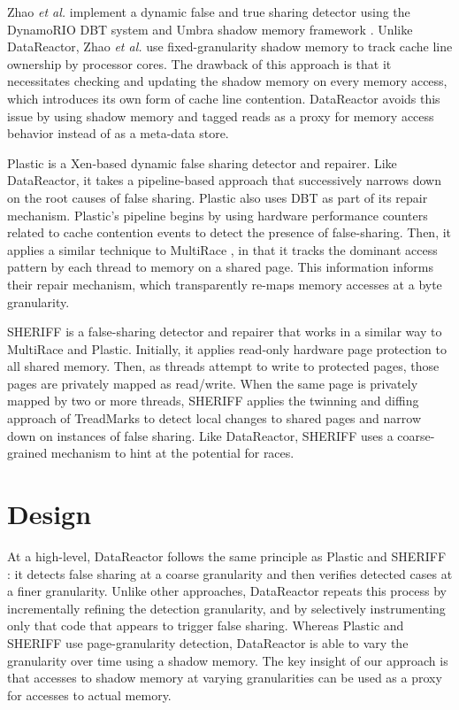\documentclass{sig-alternate}
\newcommand{\Toolname}{DataReactor}
\begin{document}

\newcommand{\DrContention}{Zhao \emph{et al.}}

\DrContention{} \cite{DrContention} implement a dynamic false and true sharing detector using the DynamoRIO \cite{DynamoRIO}
DBT system and Umbra shadow memory framework \cite{Umbra}. Unlike \Toolname{}, \DrContention{} use fixed-granularity
shadow memory to track cache line ownership by processor cores. The drawback of this approach is that it necessitates checking
and updating the shadow memory on every memory access, which introduces its own form of cache line contention. \Toolname{}
avoids this issue by using shadow memory and tagged reads as a proxy for memory access behavior instead of as a meta-data store.

Plastic \cite{Plastic} is a Xen-based dynamic false sharing detector and repairer. Like \Toolname{}, it takes a pipeline-based
approach that successively narrows down on the root causes of false sharing. Plastic also uses DBT as part of its
repair mechanism. Plastic's pipeline begins by using hardware performance counters related to cache contention
events to detect the presence of false-sharing. Then, it applies a similar technique to MultiRace \cite{MultiRace}, in
that it tracks the dominant access pattern by each thread to memory on a shared page. This information informs
their repair mechanism, which transparently re-maps memory accesses at a byte granularity.

SHERIFF \cite{SHERIFF} is a false-sharing detector and repairer that works in a similar way to MultiRace and Plastic. Initially,
it applies read-only hardware page protection to all shared memory. Then, as threads attempt to write to protected pages, those
pages are privately mapped as read/write. When the same page is privately mapped by two or more threads, SHERIFF applies
the twinning and diffing approach of TreadMarks \cite{TreadMarks} to detect local changes to shared pages and narrow down
on instances of false sharing. Like \Toolname{}, SHERIFF uses a coarse-grained mechanism to hint at the potential for races.

\section{Design}\label{sec:design}

At a high-level, \Toolname{} follows the same principle as Plastic \cite{Plastic} and SHERIFF \cite{SHERIFF}: it detects
false sharing at a coarse granularity and then verifies detected cases at a finer granularity. Unlike other approaches,
\Toolname{} repeats this process by incrementally refining the detection granularity, and by selectively instrumenting only
that code that appears to trigger false sharing. Whereas Plastic and SHERIFF use page-granularity detection, \Toolname{}
is able to vary the granularity over time using a shadow memory. The key insight of our approach is that accesses to
shadow memory at varying granularities can be used as a proxy for accesses to actual memory.
\end{document}
